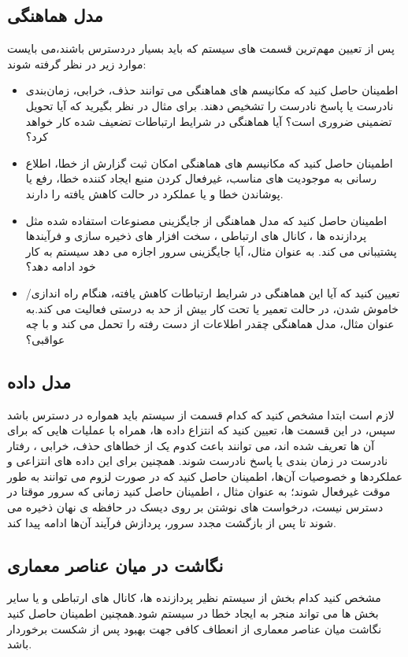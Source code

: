 \subsection{مدل هماهنگی}
پس از تعیین مهم‌ترین قسمت های سیستم که باید بسیار در‌دسترس باشند،می بایست موارد زیر در نظر گرفته شوند:
\begin{itemize}
\item
اطمینان حاصل کنید که مکانیسم های هماهنگی می توانند حذف، خرابی، زمان‌بندی نادرست یا پاسخ نادرست را تشخیص دهند. برای مثال در نظر بگیرید که آیا تحویل تضمینی ضروری است؟ آیا هماهنگی در شرایط ارتباطات تضعیف شده کار خواهد کرد؟
\item
اطمینان حاصل کنید که مکانیسم های هماهنگی امکان ثبت گزارش از خطا، اطلاع رسانی به موجودیت های مناسب، غیرفعال کردن منبع ایجاد کننده خطا، رفع یا پوشاندن خطا و یا عملکرد در حالت کاهش یافته را دارند.
\item
اطمینان حاصل کنید که مدل هماهنگی از جایگزینی مصنوعات استفاده شده مثل پردازنده ها ، کانال های ارتباطی ، سخت افزار های ذخیره سازی و فرآیندها پشتیبانی می کند. به عنوان مثال، آیا جایگزینی سرور اجازه می دهد سیستم به کار خود ادامه دهد؟
\item
تعیین کنید که آیا این هماهنگی در شرایط ارتباطات کاهش یافته، هنگام راه اندازی/ خاموش شدن، در حالت تعمیر یا تحت کار بیش از حد به درستی فعالیت می کند.به عنوان مثال، مدل هماهنگی چقدر اطلاعات از دست رفته را تحمل می کند و با چه عواقبی؟
\end{itemize}

\subsection{مدل داده}
لازم است ابتدا مشخص کنید که کدام قسمت از سیستم باید همواره در دسترس باشد سپس، در این قسمت ها، تعیین کنید که انتزاع داده ها، همراه با عملیات هایی که برای آن ها تعریف شده اند، می توانند باعث کدوم یک از خطاهای حذف، خرابی ، رفتار نادرست در زمان بندی یا پاسخ نادرست شوند.
همچنین برای این داده های انتزاعی و عملکردها و خصوصیات آن‌ها، اطمینان حاصل کنید که در صورت لزوم می توانند به طور موقت غیرفعال شوند؛ به عنوان مثال ، اطمینان حاصل کنید زمانی که سرور موقتا در دسترس نیست، درخواست های نوشتن بر روی دیسک در حافظه ی نهان ذخیره می شوند تا پس از بازگشت مجدد سرور، پردازش فرآیند آن‌ها ادامه پیدا کند.
\subsection{نگاشت در میان عناصر معماری}
مشخص کنید کدام بخش از سیستم نظیر پردازنده ها، کانال های ارتباطی و یا سایر بخش ها می تواند منجر به ایجاد خطا در سیستم شود.همچنین اطمینان حاصل کنید نگاشت میان عناصر معماری از انعطاف کافی جهت بهبود پس از شکست برخوردار باشد.
